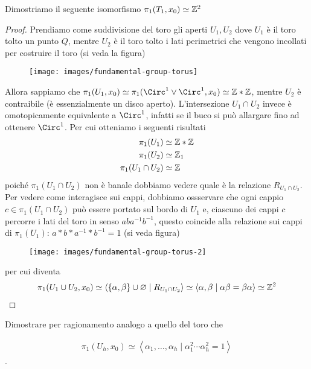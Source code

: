 \begin{xca}
	Dimostriamo il seguente isomorfismo $\pi_1(T_1, x_0) \simeq \mathbb{Z}^2$
\end{xca}
\begin{proof}
	Prendiamo come suddivisione del toro gli aperti $U_1, U_2$ dove $U_1$ è il toro tolto un punto $Q$, mentre $U_2$ è il toro tolto i lati perimetrici che vengono incollati per costruire il toro (si veda la figura)
	\begin{figure}[h]
		\centering
		\texttt{[image: images/fundamental-group-torus]}
		\caption{}
		\label{fig:fundamental-group-torus}
	\end{figure}
	Allora sappiamo che $\pi_1(U_1,x_0) \simeq \pi_1(\Circ^1 \lor \Circ^1, x_0) \simeq \Z \ast \Z$, mentre $U_2$ è contraibile (è essenzialmente un disco aperto). L'intersezione $U_1 \cap U_2$ invece è omotopicamente equivalente a $\Circ^1$, infatti se il buco si può allargare fino ad ottenere $\Circ^1$. Per cui otteniamo i seguenti risultati
	\begin{equation}
	\begin{aligned}
		\pi_1(U_1) & \simeq \mathbb{Z} \ast \mathbb{Z} \\
		\pi_1(U_2) & \simeq \mathbb{Z}_1 \\
		\pi_1(U_1 \cap U_2) &\simeq \mathbb{Z} \\
	\end{aligned}
	\end{equation}
	poiché $\pi_1(U_1 \cap U_2)$ non è banale dobbiamo vedere quale è la relazione $R_{U_1 \cap U_2}$. Per vedere come interagisce sui cappi, dobbiamo ossservare che ogni cappio $c \in \pi_1(U_1 \cap U_2)$ può essere portato sul bordo di $U_1$ e, ciascuno dei cappi $c$ percorre i lati del toro in senso $aba^{-1}b^{-1}$, questo coincide alla relazione sui cappi di $\pi_1(U_1)$: $a \ast b \ast a^{-1} \ast b^{-1} = 1$ (si veda figura)
	\begin{figure}[h]
		\centering
		\texttt{[image: images/fundamental-group-torus-2]}
		\caption{}
		\label{fig:fundamental-group-torus-2}
	\end{figure}	
	per cui diventa
	\begin{equation}
	\begin{aligned}
		\pi_1(U_1 \cup U_2, x_0) \simeq \left\langle \{\alpha, \beta\} \cup \varnothing \mid R_{U_1 \cap U_2} \right\rangle \simeq \left\langle \alpha, \beta \mid \alpha \beta = \beta \alpha \right\rangle \simeq \mathbb{Z}^2
	\end{aligned}
	\end{equation} 
\end{proof}

\begin{xca}
	Dimostrare per ragionamento analogo a quello del toro che 
	
	\begin{equation}
	\begin{aligned}
	\pi_1(U_h, x_0) \simeq \left\langle \alpha_1, \dots, \alpha_h \mid \alpha^2_1 \cdots \alpha^2_h = 1\right\rangle
	\end{aligned}
	\end{equation}.
\end{xca}

